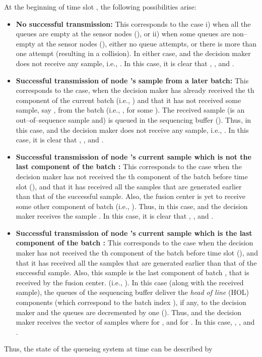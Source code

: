 \documentclass[acmtosn]{acmtrans2m}
\begin{document}
At the beginning
of time slot , the following possibilities arise:
\begin{itemize}
\item[] {\bf No successful transmission:} This corresponds to 
      the case i) when all the queues are empty at the sensor nodes 
      (), or ii) when some queues are non--empty at the sensor 
      nodes (), either no queue attempts, or there is more than 
      one attempt (resulting in a collision). In either case,  
      and the decision maker does not receive any sample, i.e., 
      . In this case, it is clear that 
      , , and .

\item[] {\bf Successful transmission of node 's sample from a later batch:} 
      This corresponds to the case, when the decision maker has already received the 
      th component of the current batch  (i.e., ) and that it has 
      not received some sample, say , from the batch  
      (i.e., , for some ). The received sample (is an out--of--sequence
      sample and) is queued in the 
      sequencing buffer (). Thus, in this case, 
       and the decision maker does not receive 
      any sample, i.e., . 
      In this case, it is clear that , , and .
 
\item[] {\bf Successful transmission of node 's current sample which 
      is not the last component of the batch :} This corresponds to 
      the case when the decision maker has not received the th component of the 
      batch  before time slot  (), and that it has received all the 
      samples that are generated earlier than that of the successful sample. Also,
      the fusion center is yet to receive some other component of batch  (i.e.,
      ). 
      Thus, in this case,  and the decision maker receives the 
      sample . 
      In this case, it is clear that , , and .  

\item[] {\bf Successful transmission of node 's current sample which 
      is the last component of the batch :} This corresponds to the case when 
      the decision maker has not received the th component of the batch  
      before time slot  (), and that it has received all the samples that are 
      generated earlier than that of the successful sample. Also, this sample is 
      the last component of batch , that is received by the fusion center.  
      (i.e., ). In this case (along with the 
      received sample), the queues of the sequencing buffer deliver the 
      {\em head of line} (HOL) components (which correspond to the batch index ), 
      if any, to the decision maker and the queues are decremented by one 
      ().   
      Thus,  and the decision maker receives the 
      vector of samples  where 
       for , 
      and  for . 
      In this case, , ,
          and .  
\end{itemize}
Thus, the state of the queueing system at time  can be described by 
\end{document}
